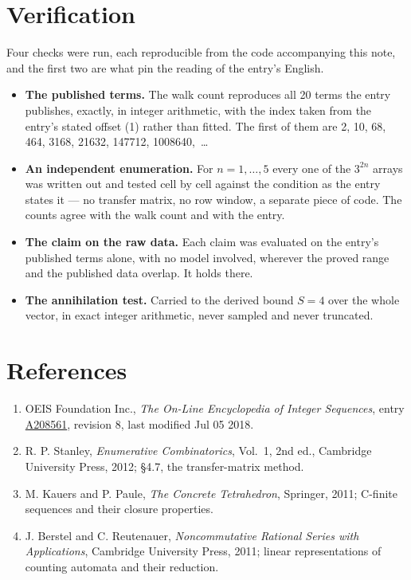 \documentclass[11pt]{article}
\theoremstyle{definition}
\begin{document}
\section{Verification}

Four checks were run, each reproducible from the code accompanying this note, and the first two are what pin the reading of the entry's English.

\begin{itemize}

\item {\bfseries The published terms.} The walk count reproduces all 20 terms the entry publishes, exactly, in integer arithmetic, with the index taken from the entry's stated offset (1) rather than fitted. The first of them are 2, 10, 68, 464, 3168, 21632, 147712, 1008640,~\dots

\item {\bfseries An independent enumeration.} For $n = 1,\dots,5$ every one of the $3^{2n}$ arrays was written out and tested cell by cell against the condition as the entry states it --- no transfer matrix, no row window, a separate piece of code. The counts agree with the walk count and with the entry.

\item {\bfseries The claim on the raw data.} Each claim was evaluated on the entry's published terms alone, with no model involved, wherever the proved range and the published data overlap. It holds there.

\item {\bfseries The annihilation test.} Carried to the derived bound $S = 4$ over the whole vector, in exact integer arithmetic, never sampled and never truncated.

\end{itemize}

\section{References}

\begin{enumerate}

\item OEIS Foundation Inc., \emph{The On-Line Encyclopedia of Integer Sequences}, entry \href{https://oeis.org/A208561}{A208561}, revision 8, last modified Jul 05 2018.

\item R. P. Stanley, \emph{Enumerative Combinatorics}, Vol.~1, 2nd ed., Cambridge University Press, 2012; \S4.7, the transfer-matrix method.

\item M. Kauers and P. Paule, \emph{The Concrete Tetrahedron}, Springer, 2011; C-finite sequences and their closure properties.

\item J. Berstel and C. Reutenauer, \emph{Noncommutative Rational Series with Applications}, Cambridge University Press, 2011; linear representations of counting automata and their reduction.

\end{enumerate}
\end{document}
